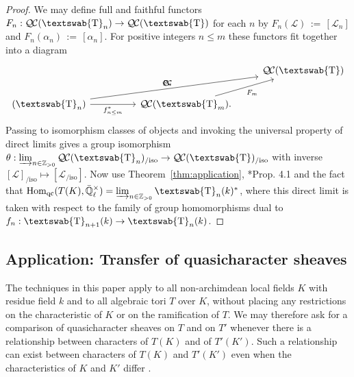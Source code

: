 \documentclass{amsart}
\theoremstyle{plain}
\theoremstyle{definition}
\theoremstyle{remark}
\newcommand{\ZZ}{{\mathbb{Z}}}
\newcommand{\EE}{\mathbb{\bar Q}_\ell}
\newcommand{\Fq}{k}
\newcommand{\EEx}{\EE^\times}
\newcommand{\mathswab}[1]{\operatorname{\textswab{#1}}}
\newcommand{\GN}[1]{\mathswab{#1}}
\DeclareMathOperator{\Hom}{Hom}
\newcommand{\ceq}{{\, :=\, }}
\newcommand{\qcs}[1]{{\mathcal{#1}}}
\newcommand{\QC}{{\mathcal{Q\hskip-0.8pt C}}}
\newcommand{\QCiso}[1]{\QC(#1)_{/\text{iso}}}
\begin{document}
\begin{proof}
We may define full and faithful functors $F_n : \QC(\GN{T}_n) \to \QC(\GN{T})$
for each $n$ by $F_n(\qcs{L}) \ceq [\qcs{L}_n]$ and $F_n(\alpha_n) \ceq [\alpha_n]$.
For positive integers $n \le m$ these functors fit together into a diagram
\[
\begin{tikzcd}
\ & & & \QC(\GN{T})\\
\arrow{urrr}{F_n} \QC(\GN{T}_n) \arrow[swap]{rr}{f_{n\leq m}^*} && \QC(\GN{T}_m) \arrow[swap]{ur}{F_m}. &
\end{tikzcd}
\]
Passing to isomorphism classes of objects and invoking the
universal property of direct limits gives a group isomorphism
$\theta: \varinjlim_{n\in \ZZ_{>0}} \QCiso{\GN{T}_n} \to \QCiso{\GN{T}}$
with inverse $[\qcs{L}]_{/\text{iso}} \mapsto [\qcs{L}_{/\text{iso}}]$.
Now use Theorem~\ref{thm:application}, \cite{cunningham-roe:dictionary}*{Prop. 4.1}
and the fact that  $\Hom_{\text{qc}}(T(K),\EEx) = \varinjlim_{n\in \ZZ_{>0}} \GN{T}_n(k)^*$,
where this direct limit is taken with respect to the family of group homomorphisms
dual to $f_{n} : \GN{T}_{n+1}(\Fq) \to \GN{T}_n(\Fq)$.
\end{proof}


\subsection{Application: Transfer of quasicharacter sheaves} \label{sec:transfer}

The techniques in this paper apply to all non-archimdean local fields $K$ with residue field $k$
and to all algebraic tori $T$ over $K$, without placing any restrictions on the characteristic of $K$
or on the ramification of $T$.
We may therefore ask for a comparison of
quasicharacter sheaves on $T$ and on $T'$ whenever there is a relationship
between characters of $T(K)$ and of $T'(K')$.
Such a relationship can exist between characters of $T(K)$ and $T'(K')$ even
when the characteristics of $K$ and $K'$ differ
.
\end{document}
